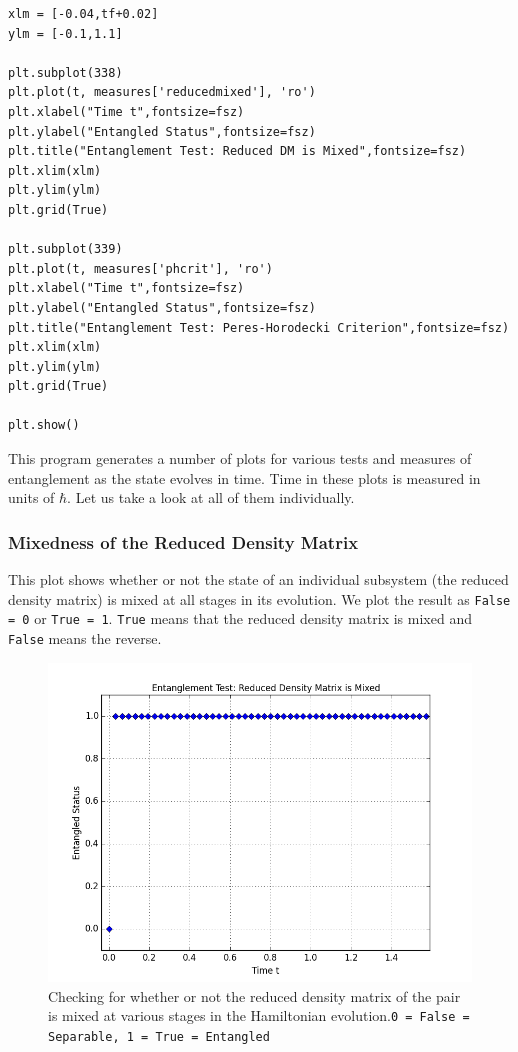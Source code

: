 \begin{verbatim}
xlm = [-0.04,tf+0.02]
ylm = [-0.1,1.1]

plt.subplot(338)
plt.plot(t, measures['reducedmixed'], 'ro')
plt.xlabel("Time t",fontsize=fsz)
plt.ylabel("Entangled Status",fontsize=fsz)
plt.title("Entanglement Test: Reduced DM is Mixed",fontsize=fsz)
plt.xlim(xlm)
plt.ylim(ylm)
plt.grid(True)

plt.subplot(339)
plt.plot(t, measures['phcrit'], 'ro')
plt.xlabel("Time t",fontsize=fsz)
plt.ylabel("Entangled Status",fontsize=fsz)
plt.title("Entanglement Test: Peres-Horodecki Criterion",fontsize=fsz)
plt.xlim(xlm)
plt.ylim(ylm)
plt.grid(True)

plt.show()

\end{verbatim}
\par This program generates a number of plots for various tests and measures of entanglement as the state evolves in time. Time in these plots is measured in units of $\hbar$. Let us take a look at all of them individually.
\pagebreak
\subsubsection{Mixedness of the Reduced Density Matrix}
This plot shows whether or not the state of an individual subsystem (the reduced density matrix) is mixed at all stages in its evolution. We plot the result as \texttt{False = 0} or \texttt{True = 1}. \texttt{True} means that the reduced density matrix is mixed and \texttt{False} means the reverse.

\begin{center}
\begin{figure}[H]
  \begin{center}
    \includegraphics[scale=0.62]{figures/timeevolution-08.png}
    \caption{Checking for whether or not the reduced density matrix of the pair is mixed at various stages in the Hamiltonian evolution.\newline \texttt{0 = False = Separable,    1 = True = Entangled} }
    \label{fig: Time Evolution: Mixedness of Reduced DM}
  \end{center}
\end{figure}
\end{center}

